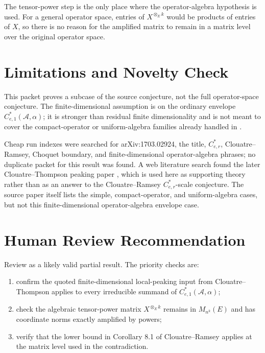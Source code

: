 \documentclass[11pt]{article}
\newcommand{\A}{\mathcal A}
\begin{document}
The tensor-power step is the only place where the operator-algebra hypothesis is
used. For a general operator space, entries of \(X^{\otimes_E k}\) would be
products of entries of \(X\), so there is no reason for the amplified matrix to
remain in a matrix level over the original operator space.

\section*{Limitations and Novelty Check}

This packet proves a subcase of the source conjecture, not the full
operator-space conjecture. The finite-dimensional assumption is on the ordinary
envelope \(C^*_{e,1}(\A,\alpha)\); it is stronger than residual finite
dimensionality and is not meant to cover the compact-operator or uniform-algebra
families already handled in \cite{CR}.

Cheap run indexes were searched for arXiv:1703.02924, the title, \(C^*_{e,r}\),
Clouatre--Ramsey, Choquet boundary, and finite-dimensional operator-algebra
phrases; no duplicate packet for this result was found. A web literature search
found the later Clouatre--Thompson peaking paper \cite{CT}, which is used here
as supporting theory rather than as an answer to the Clouatre--Ramsey
\(C^*_{e,r}\)-scale conjecture. The source paper itself lists the simple,
compact-operator, and uniform-algebra cases, but not this finite-dimensional
operator-algebra envelope case.

\section*{Human Review Recommendation}

Review as a likely valid partial result. The priority checks are:
\begin{enumerate}
\item confirm the quoted finite-dimensional local-peaking input from
Clouatre--Thompson applies to every irreducible summand of
\(C^*_{e,1}(\A,\alpha)\);
\item check the algebraic tensor-power matrix \(X^{\otimes_E k}\) remains in
\(M_{n^k}(E)\) and has coordinate norms exactly amplified by powers;
\item verify that the lower bound in Corollary 8.1 of Clouatre--Ramsey applies
at the matrix level used in the contradiction.
\end{enumerate}
\end{document}
